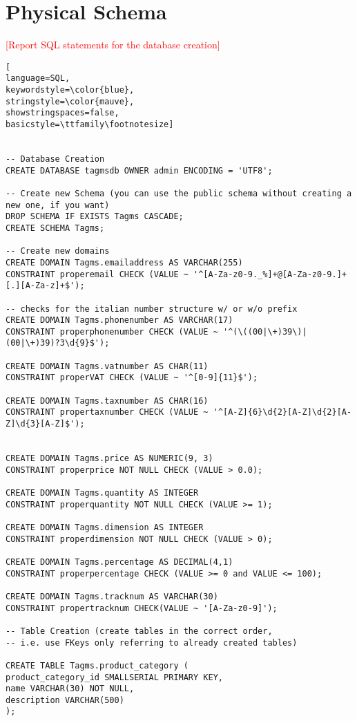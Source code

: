 \section{Physical Schema}
\textcolor{red}{[Report SQL statements for the database creation]}

\begin{lstlisting}[
language=SQL,
keywordstyle=\color{blue},
stringstyle=\color{mauve},
showstringspaces=false,
basicstyle=\ttfamily\footnotesize]


-- Database Creation
CREATE DATABASE tagmsdb OWNER admin ENCODING = 'UTF8';

-- Create new Schema (you can use the public schema without creating a new one, if you want)
DROP SCHEMA IF EXISTS Tagms CASCADE;
CREATE SCHEMA Tagms;

-- Create new domains
CREATE DOMAIN Tagms.emailaddress AS VARCHAR(255)
CONSTRAINT properemail CHECK (VALUE ~ '^[A-Za-z0-9._%]+@[A-Za-z0-9.]+[.][A-Za-z]+$');

-- checks for the italian number structure w/ or w/o prefix
CREATE DOMAIN Tagms.phonenumber AS VARCHAR(17)
CONSTRAINT properphonenumber CHECK (VALUE ~ '^(\((00|\+)39\)|(00|\+)39)?3\d{9}$');

CREATE DOMAIN Tagms.vatnumber AS CHAR(11)
CONSTRAINT properVAT CHECK (VALUE ~ '^[0-9]{11}$');

CREATE DOMAIN Tagms.taxnumber AS CHAR(16)
CONSTRAINT propertaxnumber CHECK (VALUE ~ '^[A-Z]{6}\d{2}[A-Z]\d{2}[A-Z]\d{3}[A-Z]$');


CREATE DOMAIN Tagms.price AS NUMERIC(9, 3)
CONSTRAINT properprice NOT NULL CHECK (VALUE > 0.0);

CREATE DOMAIN Tagms.quantity AS INTEGER
CONSTRAINT properquantity NOT NULL CHECK (VALUE >= 1);

CREATE DOMAIN Tagms.dimension AS INTEGER
CONSTRAINT properdimension NOT NULL CHECK (VALUE > 0);

CREATE DOMAIN Tagms.percentage AS DECIMAL(4,1)
CONSTRAINT properpercentage CHECK (VALUE >= 0 and VALUE <= 100);

CREATE DOMAIN Tagms.tracknum AS VARCHAR(30)
CONSTRAINT propertracknum CHECK(VALUE ~ '[A-Za-z0-9]');

-- Table Creation (create tables in the correct order,
-- i.e. use FKeys only referring to already created tables)

CREATE TABLE Tagms.product_category (
product_category_id SMALLSERIAL PRIMARY KEY,
name VARCHAR(30) NOT NULL,
description VARCHAR(500)
);


\end{lstlisting}
